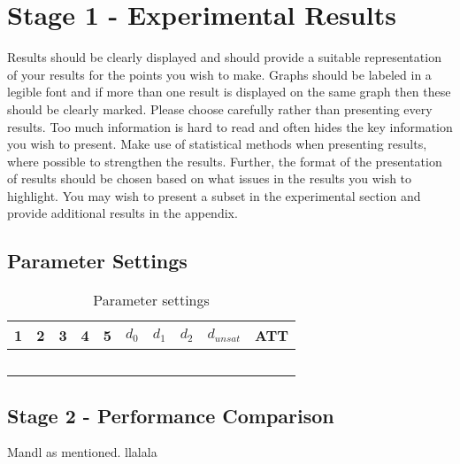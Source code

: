 \section{Stage 1 - Experimental Results}

Results should be clearly displayed and should provide a suitable representation of your results for the points you wish to make. Graphs should be labeled in a legible font and if more than one result is displayed on the same graph then these should be clearly marked.   Please choose carefully rather than presenting every results. Too much information is hard to read and often hides the key information you wish to present. Make use of statistical methods when presenting results, where possible to strengthen the results.  Further, the format of the presentation of results should be chosen based on what issues in the results you wish to highlight. You may wish to present a subset in the experimental section and provide additional results in the appendix.


\subsection{Parameter Settings}

\begin{table}[H]
\centering
    \begin{tabular}{|l|l|l|l|l||l|l|l|l|l|}

 	\hline
 	1 & 2 & 3 & 4 & 5 & $d_0$ & $d_1$ & $d_2$ & $d_{unsat}$ & ATT \\
 	\hline
    ~ & ~ & ~ & ~ & ~ & ~ & ~ & ~ & ~ & ~ \\

	\hline
    \end{tabular}
    \caption {Parameter settings}
    \label{table:parameterSettings}

\end{table}

\subsection{Stage 2 - Performance Comparison}

Mandl as mentioned. llalala